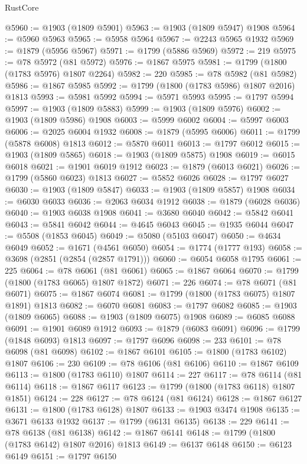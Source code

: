 \begin{lexlean}{RustCore}
\begin{coremodule}
@5960 := @1903 (@1809 @5901)
@5963 := @1903 (@1809 @5947) @1908
@5964 := @5960 @5963
@5965 := @5958 @5964
@5967 := @2243 @5965 @1932
@5969 := @1879 (@5956 @5967)
@5971 := @1799 (@5886 @5969)
@5972 := 219
@5975 := @78 @5972 (@81 @5972)
@5976 := @1867 @5975
@5981 := @1799 (@1800 (@1783 @5976) @1807 @2264)
@5982 := 220
@5985 := @78 @5982 (@81 @5982)
@5986 := @1867 @5985
@5992 := @1799 (@1800 (@1783 @5986) @1807 @2016) @1813
@5993 := @5981 @5992
@5994 := @5971 @5993
@5995 := @1797 @5994
@5997 := @1903 (@1809 @5883)
@5999 := @1903 (@1809 @5976)
@6002 := @1903 (@1809 @5986) @1908
@6003 := @5999 @6002
@6004 := @5997 @6003
@6006 := @2025 @6004 @1932
@6008 := @1879 (@5995 @6006)
@6011 := @1799 (@5878 @6008) @1813
@6012 := @5870 @6011
@6013 := @1797 @6012
@6015 := @1903 (@1809 @5865)
@6018 := @1903 (@1809 @5875) @1908
@6019 := @6015 @6018
@6021 := @1901 @6019 @1912
@6023 := @1879 (@6013 @6021)
@6026 := @1799 (@5860 @6023) @1813
@6027 := @5852 @6026
@6028 := @1797 @6027
@6030 := @1903 (@1809 @5847)
@6033 := @1903 (@1809 @5857) @1908
@6034 := @6030 @6033
@6036 := @2063 @6034 @1912
@6038 := @1879 (@6028 @6036)
@6040 := @1903 @6038 @1908
@6041 := @3680 @6040
@6042 := @5842 @6041
@6043 := @5841 @6042
@6044 := @4645 @6043
@6045 := @1935 @6044
@6047 := @5508 (@1853 @6045)
@6049 := @5080 (@5103 @6047)
@6050 := @4634 @6049
@6052 := @1671 (@4561 @6050)
@6054 := @1774 (@1777 @193)
@6058 := @3698 (@2851 (@2854 (@2857 @1791)))
@6060 := @6054 @6058 @1795
@6061 := 225
@6064 := @78 @6061 (@81 @6061)
@6065 := @1867 @6064
@6070 := @1799 (@1800 (@1783 @6065) @1807 @1872)
@6071 := 226
@6074 := @78 @6071 (@81 @6071)
@6075 := @1867 @6074
@6081 := @1799 (@1800 (@1783 @6075) @1807 @1891) @1813
@6082 := @6070 @6081
@6083 := @1797 @6082
@6085 := @1903 (@1809 @6065)
@6088 := @1903 (@1809 @6075) @1908
@6089 := @6085 @6088
@6091 := @1901 @6089 @1912
@6093 := @1879 (@6083 @6091)
@6096 := @1799 (@1848 @6093) @1813
@6097 := @1797 @6096
@6098 := 233
@6101 := @78 @6098 (@81 @6098)
@6102 := @1867 @6101
@6105 := @1800 (@1783 @6102) @1807
@6106 := 230
@6109 := @78 @6106 (@81 @6106)
@6110 := @1867 @6109
@6113 := @1800 (@1783 @6110) @1807
@6114 := 227
@6117 := @78 @6114 (@81 @6114)
@6118 := @1867 @6117
@6123 := @1799 (@1800 (@1783 @6118) @1807 @1851)
@6124 := 228
@6127 := @78 @6124 (@81 @6124)
@6128 := @1867 @6127
@6131 := @1800 (@1783 @6128) @1807
@6133 := @1903 @3474 @1908
@6135 := @3671 @6133 @1932
@6137 := @1799 (@6131 @6135)
@6138 := 229
@6141 := @78 @6138 (@81 @6138)
@6142 := @1867 @6141
@6148 := @1799 (@1800 (@1783 @6142) @1807 @2016) @1813
@6149 := @6137 @6148
@6150 := @6123 @6149
@6151 := @1797 @6150

\end{coremodule}
\end{lexlean}
